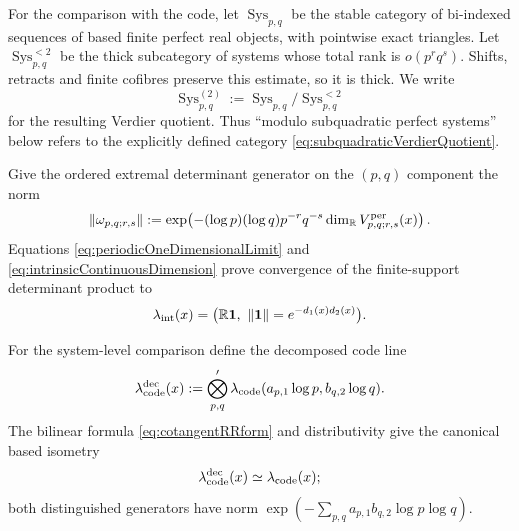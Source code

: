 \documentclass[11pt]{amsart}
\theoremstyle{definition}
\theoremstyle{remark}
\newcommand{\R}{\mathbb R}
\begin{document}
For the comparison with the code, let $\operatorname{Sys}_{p,q}$ be the
stable category of bi-indexed sequences of based finite perfect real
objects, with pointwise exact triangles.  Let
$\operatorname{Sys}_{p,q}^{<2}$ be the thick subcategory of systems whose
total rank is $o(p^rq^s)$.  Shifts, retracts and finite cofibres preserve
this estimate, so it is thick.  We write
\begin{equation}\label{eq:subquadraticVerdierQuotient}
 \operatorname{Sys}_{p,q}^{(2)}
 :=\operatorname{Sys}_{p,q}/\operatorname{Sys}_{p,q}^{<2}
\end{equation}
for the resulting Verdier quotient.  Thus ``modulo subquadratic perfect
systems'' below refers to the explicitly defined category
\eqref{eq:subquadraticVerdierQuotient}.

Give the ordered extremal determinant generator on the $(p,q)$ component
the norm
\begin{equation}\label{eq:intrinsicFiniteMetric}
 \|\omega_{p,q;r,s}\|
 :=\exp\!\left(-(\log p)(\log q)p^{-r}q^{-s}
    \dim_\R V_{p,q;r,s}^{\rm per}(x)\right).
\end{equation}
Equations \eqref{eq:periodicOneDimensionalLimit} and
\eqref{eq:intrinsicContinuousDimension} prove convergence of the
finite-support determinant product to
\begin{equation}\label{eq:intrinsicRRline}
 \lambda_{\rm int}(x)
 =\bigl(\R\mathbf1,\ \|\mathbf1\|=e^{-d_1(x)d_2(x)}\bigr).
\end{equation}

For the system-level comparison define the decomposed code line
\begin{equation}\label{eq:decomposedCodeCertificate}
 \lambda_{\rm code}^{\rm dec}(x):=
 \bigotimes_{p,q}'
 \lambda_{\rm code}(a_{p,1}\log p,b_{q,2}\log q).
\end{equation}
The bilinear formula \eqref{eq:cotangentRRform} and distributivity give the
canonical based isometry
\begin{equation}\label{eq:decomposedTotalCodeIsometry}
 \lambda_{\rm code}^{\rm dec}(x)\simeq\lambda_{\rm code}(x);
\end{equation}
both distinguished generators have norm
$\exp(-\sum_{p,q}a_{p,1}b_{q,2}\log p\log q)$.
\end{document}
